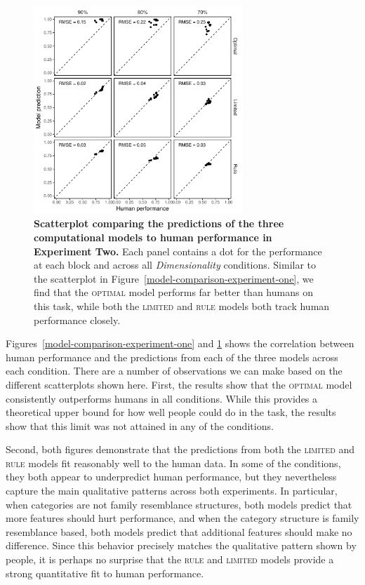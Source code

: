 \documentclass[a4paper, doc, floatsintext]{apa6}
\begin{document}
\begin{figure}[h!]
  \begin{center}
    \includegraphics[width=0.7\textwidth]{figures/human-model-correlation-experiment-two.pdf}
    \caption{\small{\textbf{Scatterplot comparing the predictions of the three computational models to human performance in Experiment Two.} Each panel contains a dot for the performance at each block and across all \textit{Dimensionality} conditions.} Similar to the scatterplot in  Figure~\ref{model-comparison-experiment-one}, we find that the \textsc{optimal} model performs far better than humans on this task, while both the \textsc{limited} and \textsc{rule} models both track human performance closely.}
  \label{model-comparison-experiment-two}
  \end{center}
\end{figure}

Figures~\ref{model-comparison-experiment-one} and \ref{model-comparison-experiment-two} shows the correlation between human performance and the predictions from each of the three models across each condition. There are a number of observations we can make based on the different scatterplots shown here. First, the results show that the \textsc{optimal} model consistently outperforms humans in all conditions. While this provides a theoretical upper bound for how well people could do in the task, the results show that this limit was not attained in any of the conditions.

Second, both figures demonstrate that the predictions from both the \textsc{limited} and \textsc{rule} models fit reasonably well to the human data. In some of the conditions, they both appear to underpredict human performance, but they nevertheless capture the main qualitative patterns across both experiments. In particular, when categories are not family resemblance structures, both models predict that more features should hurt performance, and when the category structure is family resemblance based, both models predict that additional features should make no difference. Since this behavior precisely matches the qualitative pattern shown by people, it is perhaps no surprise that the \textsc{rule} and \textsc{limited} models provide a strong quantitative fit to human performance.
\end{document}
